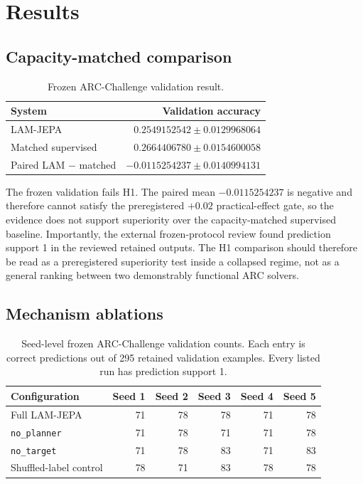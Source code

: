 \documentclass[twoside]{article}
\begin{document}
\section{Results}
\subsection{Capacity-matched comparison}
\begin{table}[t]
\centering
\small
\caption{Frozen ARC-Challenge validation result.}
\begin{tabular}{@{}lr@{}}
\toprule
System & Validation accuracy \\
\midrule
LAM-JEPA & $0.2549152542 \pm 0.0129968064$ \\
Matched supervised & $0.2664406780 \pm 0.0154600058$ \\
Paired LAM $-$ matched & $-0.0115254237 \pm 0.0140994131$ \\
\bottomrule
\end{tabular}
\end{table}
The frozen validation fails H1. The paired mean $-0.0115254237$ is negative and therefore cannot satisfy the preregistered $+0.02$ practical-effect gate, so the evidence does not support superiority over the capacity-matched supervised baseline. Importantly, the external frozen-protocol review found prediction support 1 in the reviewed retained outputs. The H1 comparison should therefore be read as a preregistered superiority test inside a collapsed regime, not as a general ranking between two demonstrably functional ARC solvers.

\subsection{Mechanism ablations}
\begin{table}[t]
\centering
\caption{Seed-level frozen ARC-Challenge validation counts. Each entry is correct predictions out of 295 retained validation examples. Every listed run has prediction support 1.}
\begin{tabular}{@{}lrrrrr@{}}
\toprule
Configuration & Seed 1 & Seed 2 & Seed 3 & Seed 4 & Seed 5 \\
\midrule
Full LAM-JEPA & 71 & 78 & 78 & 71 & 78 \\
\texttt{no\_planner} & 71 & 78 & 71 & 71 & 78 \\
\texttt{no\_target} & 71 & 78 & 83 & 71 & 83 \\
Shuffled-label control & 78 & 71 & 83 & 78 & 78 \\
\bottomrule
\end{tabular}
\end{table}
\end{document}
